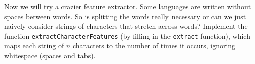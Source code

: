 \item {}

Now we will try a crazier feature extractor.  Some languages are written without
spaces between words. So is splitting the words really necessary or can we just
naively consider strings of characters that stretch across words? Implement the
function {\tt extractCharacterFeatures} (by filling in the {\tt extract}
function), which maps each string of $n$ characters to the number of times it
occurs, ignoring whitespace (spaces and tabs).

